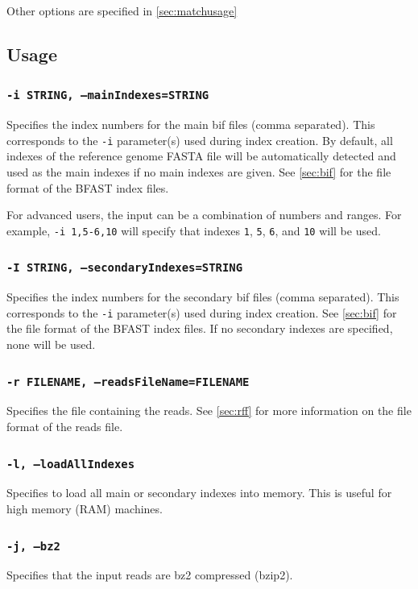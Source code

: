 \documentclass[a4paper,12pt]{book}
\newcommand{\TT}[1]{{\tt #1}} %
\newcommand{\rGFF}{reference genome FASTA file}
\newcommand{\BIF}{BFAST index file} %
\begin{document}
Other options are specified in \autoref{sec:matchusage}

\subsection{Usage}
\label{sec:matchusage}

\subsubsection{\TT{-i STRING, --mainIndexes=STRING}}
Specifies the index numbers for the main bif files (comma separated).
This corresponds to the \TT{-i} parameter(s) used during index creation.
By default, all indexes of the \rGFF{} will be automatically detected and used as the main indexes if no main indexes are given.
See \autoref{sec:bif} for the file format of the \BIF{s}.

For advanced users, the input can be a combination of numbers and ranges.
For example, \TT{-i 1,5-6,10} will specify that indexes \TT{1}, \TT{5}, \TT{6}, and \TT{10} will be used.

\subsubsection{\TT{-I STRING, --secondaryIndexes=STRING}}
Specifies the index numbers for the secondary bif files (comma separated).
This corresponds to the \TT{-i} parameter(s) used during index creation.
See \autoref{sec:bif} for the file format of the \BIF{s}.
If no secondary indexes are specified, none will be used.

\subsubsection{\TT{-r FILENAME, --readsFileName=FILENAME}}
Specifies the file containing the reads.
See \autoref{sec:rff} for more information on the file format of the reads file.
\subsubsection{\TT{-l, --loadAllIndexes}}
Specifies to load all main or secondary indexes into memory.
This is useful for high memory (RAM) machines.

\subsubsection{\TT{-j, --bz2}}
Specifies that the input reads are bz2 compressed (bzip2).
\end{document}
